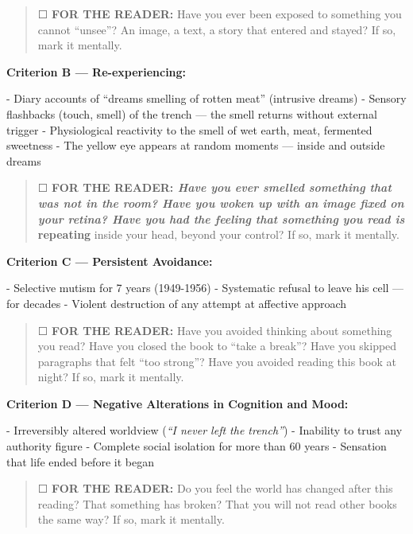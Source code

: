 \begin{quote}
☐ \textbf{FOR THE READER:} Have you ever been exposed to something you cannot \textquotedblleft{}unsee\textquotedblright{}? An image, a text, a story that entered and stayed? If so, mark it mentally.
\end{quote}

\noindent \textbf{Criterion B --- Re-experiencing:}

\noindent - Diary accounts of \textquotedblleft{}dreams smelling of rotten meat\textquotedblright{} (intrusive dreams)
- Sensory flashbacks (touch, smell) of the trench --- the smell returns without external trigger
- Physiological reactivity to the smell of wet earth, meat, fermented sweetness
- The yellow eye appears at random moments --- inside and outside dreams

\begin{quote}
☐ \textbf{FOR THE READER:\textit{ Have you ever smelled something that was not in the room? Have you woken up with an image fixed on your retina? Have you had the feeling that something you read is }repeating} inside your head, beyond your control? If so, mark it mentally.
\end{quote}

\noindent \textbf{Criterion C --- Persistent Avoidance:}

\noindent - Selective mutism for 7 years (1949-1956)
- Systematic refusal to leave his cell --- for decades
- Violent destruction of any attempt at affective approach

\begin{quote}
☐ \textbf{FOR THE READER:} Have you avoided thinking about something you read? Have you closed the book to \textquotedblleft{}take a break\textquotedblright{}? Have you skipped paragraphs that felt \textquotedblleft{}too strong\textquotedblright{}? Have you avoided reading this book at night? If so, mark it mentally.
\end{quote}

\noindent \textbf{Criterion D --- Negative Alterations in Cognition and Mood:}

\noindent - Irreversibly altered worldview (\textit{\textquotedblleft{}I never left the trench\textquotedblright{}})
- Inability to trust any authority figure
- Complete social isolation for more than 60 years
- Sensation that life ended before it began

\begin{quote}
☐ \textbf{FOR THE READER:} Do you feel the world has changed after this reading? That something has broken? That you will not read other books the same way? If so, mark it mentally.
\end{quote}

